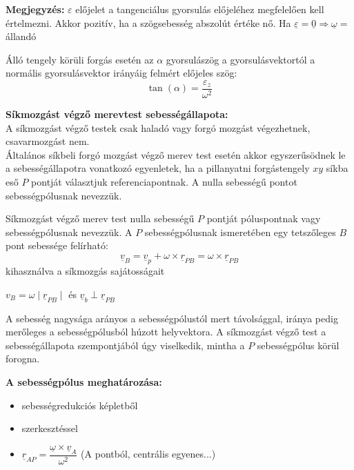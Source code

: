 \textbf{Megjegyzés:} \(\varepsilon\) előjelet a tangenciálus gyorsulás előjeléhez megfelelően kell értelmezni. Akkor pozitív, ha a szögsebesség abszolút értéke nő. Ha \(\underline{\varepsilon} = \underline{0} \Rightarrow \underline{\omega} = \) állandó
\begin{tcolorbox}[colback=MidnightBlue!5!white,colframe=MidnightBlue!60!black,title= Definíció]
   Álló tengely körüli forgás esetén az \(\alpha\) gyorsulászög a gyorsulásvektortól a normális gyorsulásvektor irányáig felmért előjeles szög:
   $$\tan(\alpha) = \dfrac{\varepsilon_z}{\omega^2}$$
\end{tcolorbox}
\textbf{Síkmozgást végző merevtest sebességállapota:}\\
A síkmozgást végző testek csak haladó vagy forgó mozgást végezhetnek, csavarmozgást nem. \\
Általános síkbeli forgó mozgást végző merev test esetén akkor egyszerűsödnek le a sebességállapotra vonatkozó egyenletek, ha a pillanyatni forgástengely \(xy\) síkba eső \(P\) pontját választjuk referenciapontnak. A nulla sebességű pontot sebességpólusnak nevezzük.
\begin{tcolorbox}[colback=MidnightBlue!5!white,colframe=MidnightBlue!60!black,title= Definíció]
    Síkmozgást végző merev test nulla sebességű \(P\) pontját póluspontnak vagy sebességpólusnak nevezzük.
    A \(P\) sebességpólusnak ismeretében egy tetszőleges \(B\) pont sebessége felírható:
    $$\underline{v}_B = \underline{v}_p + \omega \times \underline{r}_{PB} = \omega \times \underline{r}_{PB}$$
    kihasználva a síkmozgás sajátosságait
    \begin{center}
    \(v_B = \omega \mid \underline{r}_{PB} \mid\) és \(\underline{v}_b \perp \underline{r}_{PB}\)
    \end{center}
    A sebesség nagysága arányos a sebességpólustól mert távolsággal, iránya pedig merőleges a sebességpólusból húzott helyvektora. A síkmozgást végző test a sebességállapota szempontjából úgy viselkedik, mintha a \(P\) sebességpólus körül forogna.
 \end{tcolorbox}
 \textbf{A sebességpólus meghatározása:}
 \begin{itemize}
    \item sebességredukciós képletből
    \item szerkesztéssel
    \item \(\underline{r}_{AP} = \dfrac{\underline{\omega} \times \underline{v}_A}{\omega^2}\) (A pontból, centrális egyenes...)
 \end{itemize}
